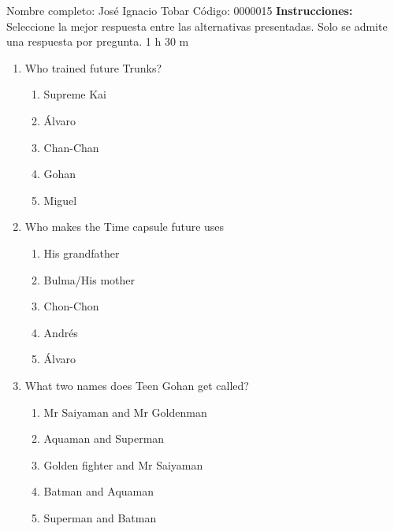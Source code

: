 \documentclass[letterpaper,addpoints,answers,twocolumn,10pt]{exam}
\begin{document}
\noindent Nombre completo: José Ignacio Tobar
\newline \newline \newline \newline
Código: 0000015\newline \newline 
{\bf Instrucciones:} Seleccione la mejor respuesta entre las alternativas presentadas. Solo se admite una respuesta por pregunta.
 1 h 30 m

\begin{enumerate}[leftmargin=.2in]




\item  Who trained future Trunks?


\begin{enumerate}[noitemsep,leftmargin=0in]


\item  Supreme Kai
\item  Álvaro
\item  Chan-Chan
\item  Gohan
\item  Miguel


\end{enumerate}



\item  Who makes the Time capsule future uses


\begin{enumerate}[noitemsep,leftmargin=0in]


\item  His grandfather
\item  Bulma/His mother
\item  Chon-Chon
\item  Andrés
\item  Álvaro


\end{enumerate}



\item  What two names does Teen Gohan get called?


\begin{enumerate}[noitemsep,leftmargin=0in]


\item  Mr Saiyaman and Mr Goldenman
\item  Aquaman and Superman
\item  Golden fighter and Mr Saiyaman
\item  Batman and Aquaman
\item  Superman and Batman



\end{enumerate}
\end{enumerate}
\end{document}
